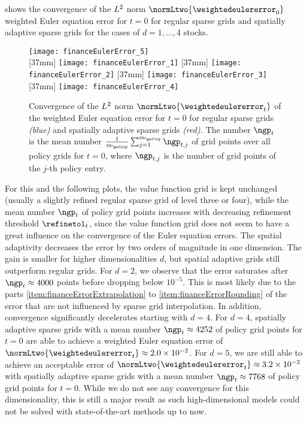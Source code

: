  shows the convergence of the
$L^2$ norm $\normLtwo{\weightedeulererror_0}$
weighted Euler equation error for $t = 0$ for regular sparse grids
and spatially adaptive sparse grids
for the cases of $d = 1, \dotsc, 4$ stocks.
\begin{figure}
  \texttt{[image: financeEulerError\_5]}%
  \\[2mm]%
  [37mm]{%
    \texttt{[image: financeEulerError\_1]}%
  }%
  \hfill%
  [37mm]{%
    \texttt{[image: financeEulerError\_2]}%
  }%
  \hfill%
  [37mm]{%
    \texttt{[image: financeEulerError\_3]}%
  }%
  \hfill%
  [37mm]{%
    \texttt{[image: financeEulerError\_4]}%
  }%
  \caption[Convergence of the weighted Euler equation error]{%
    Convergence of the $L^2$ norm $\normLtwo{\weightedeulererror_t}$
    of the weighted Euler equation error for $t = 0$ for
    regular sparse grids \emph{\textcolor{C0}{(blue)}} and
    spatially adaptive sparse grids \emph{\textcolor{C1}{(red)}.}
    The number $\ngp_t$ is the mean number
    $\frac{1}{m_{\policy}} \sum_{j=1}^{m_{\policy}} \ngp_{t,j}$
    of grid points over all policy grids for $t = 0$,
    where $\ngp_{t,j}$ is the number of grid points
    of the $j$-th policy entry.%
  }%
  \label{fig:financeEulerError}%
\end{figure}%
For this and the following plots,
the value function grid is kept unchanged
(usually a slightly refined regular sparse grid of level three or four),
while the mean number $\ngp_t$ of policy grid points increases
with decreasing refinement threshold $\refinetol_t$,
since the value function grid does not seem to have a great influence
on the convergence of the Euler equation errors.
The spatial adaptivity decreases the error by
two orders of magnitude in one dimension.
The gain is smaller for higher dimensionalities $d$,
but spatial adaptive grids still outperform regular grids.
For $d = 2$, we observe that the error saturates
after $\ngp_t \approx \num{4000}$ points before dropping below $10^{-5}$.
This is most likely due to the parts
\ref{item:financeErrorExtrapolation} to
\ref{item:financeErrorRounding} of the error that are not influenced
by sparse grid interpolation.
In addition, convergence significantly decelerates starting with $d = 4$.
For $d = 4$, spatially adaptive sparse grids with
a mean number $\ngp_t \approx \num{4252}$ of policy grid points for $t = 0$
are able to achieve a weighted Euler equation error of
$\normLtwo{\weightedeulererror_t} \approx \num{2.0e-2}$.
For $d = 5$, we are still able to achieve an acceptable error of
$\normLtwo{\weightedeulererror_t} \approx \num{3.2e-2}$
with spatially adaptive sparse grids with
a mean number $\ngp_t \approx \num{7768}$ of policy grid points for $t = 0$.
While we do not see any convergence for this dimensionality,
this is still a major result as such high-dimensional models
could not be solved with state-of-the-art methods up to now.

